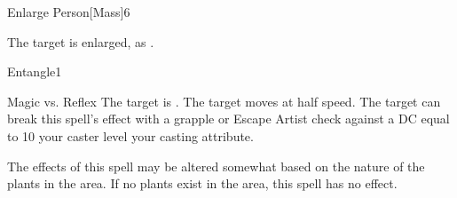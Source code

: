\begin{spellsection}{Enlarge Person}[Mass]{6}
\begin{spellheader}
\end{spellheader}
\begin{spellcontent}
    \begin{spelltargetinginfo}
    \end{spelltargetinginfo}
    \begin{spelleffects}
        \spelleffect The target is enlarged, as .
        \spelldur \durshort \dismissable
    \end{spelleffects}
\end{spellcontent}
\begin{spellfooter}
    \spellnotes \sizingspellnotes
\end{spellfooter}
\end{spellsection}

\begin{spellsection}{Entangle}{1}
\begin{spellheader}
\end{spellheader}
\begin{spellcontent}
    \begin{spelltargetinginfo}
    \end{spelltargetinginfo}
    \begin{spelleffects}
        \begin{spellattack}{Magic vs. Reflex}
            \spellsuccess The target is \immobilized.
            \spellfailure The target moves at half speed.
            \spellspecial The target can break this spell's effect with a grapple or Escape Artist check against a DC equal to 10 \add your caster level \add your casting attribute.
        \end{spellattack}
        \spelldur \durshort
    \end{spelleffects}
\end{spellcontent}
\begin{spellfooter}
    \spellnotes The effects of this spell may be altered somewhat based on the nature of the plants in the area. If no plants exist in the area, this spell has no effect.
\end{spellfooter}
\end{spellsection}

